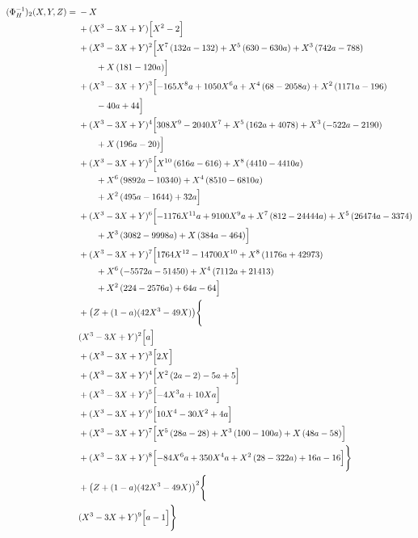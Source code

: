 \begin{align*}
(\Phi_H^{-1})_2(X,Y,Z)={}&- X\\
&{}+(X^3-3X+Y)\Bigl[X^{2} - 2\Bigr]\\
&{}+(X^3-3X+Y)^{2}\Bigl[X^{7} \left(132 a - 132\right) + X^{5} \left(630 - 630 a\right) + X^{3} \left(742 a - 788\right)\\
&\qquad + X \left(181 - 120 a\right)\Bigr]\\
&{}+(X^3-3X+Y)^{3}\Bigl[- 165 X^{8} a + 1050 X^{6} a + X^{4} \left(68 - 2058 a\right) + X^{2} \left(1171 a - 196\right)\\
&\qquad - 40 a + 44\Bigr]\\
&{}+(X^3-3X+Y)^{4}\Bigl[308 X^{9} - 2040 X^{7} + X^{5} \left(162 a + 4078\right) + X^{3} \left(- 522 a - 2190\right)\\
&\qquad + X \left(196 a - 20\right)\Bigr]\\
&{}+(X^3-3X+Y)^{5}\Bigl[X^{10} \left(616 a - 616\right) + X^{8} \left(4410 - 4410 a\right)\\
&\qquad + X^{6} \left(9892 a - 10340\right) + X^{4} \left(8510 - 6810 a\right)\\
&\qquad + X^{2} \left(495 a - 1644\right) + 32 a\Bigr]\\
&{}+(X^3-3X+Y)^{6}\Bigl[- 1176 X^{11} a + 9100 X^{9} a + X^{7} \left(812 - 24444 a\right) + X^{5} \left(26474 a - 3374\right)\\
&\qquad + X^{3} \left(3082 - 9998 a\right) + X \left(384 a - 464\right)\Bigr]\\
&{}+(X^3-3X+Y)^{7}\Bigl[1764 X^{12} - 14700 X^{10} + X^{8} \left(1176 a + 42973\right)\\
&\qquad + X^{6} \left(- 5572 a - 51450\right) + X^{4} \left(7112 a + 21413\right)\\
&\qquad + X^{2} \left(224 - 2576 a\right) + 64 a - 64\Bigr]\\
&{}+\bigl(Z+(1-a)(42X^3-49X)\bigr)\Biggl\{\\
&{}(X^3-3X+Y)^{2}\Bigl[a\Bigr]\\
&{}+(X^3-3X+Y)^{3}\Bigl[2 X\Bigr]\\
&{}+(X^3-3X+Y)^{4}\Bigl[X^{2} \left(2 a - 2\right) - 5 a + 5\Bigr]\\
&{}+(X^3-3X+Y)^{5}\Bigl[- 4 X^{3} a + 10 X a\Bigr]\\
&{}+(X^3-3X+Y)^{6}\Bigl[10 X^{4} - 30 X^{2} + 4 a\Bigr]\\
&{}+(X^3-3X+Y)^{7}\Bigl[X^{5} \left(28 a - 28\right) + X^{3} \left(100 - 100 a\right) + X \left(48 a - 58\right)\Bigr]\\
&{}+(X^3-3X+Y)^{8}\Bigl[- 84 X^{6} a + 350 X^{4} a + X^{2} \left(28 - 322 a\right) + 16 a - 16\Bigr]\Biggr\}\\
&{}+\bigl(Z+(1-a)(42X^3-49X)\bigr)^{2}\Biggl\{\\
&{}(X^3-3X+Y)^{9}\Bigl[a - 1\Bigr]\Biggr\}
\end{align*}

